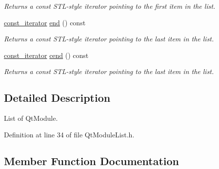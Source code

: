 \begin{DoxyCompactItemize}
\begin{DoxyCompactList}\small\item\em Returns a const S\+T\+L-\/style iterator pointing to the first item in the list. \end{DoxyCompactList}\item 
\hyperlink{class_mdt_1_1_deploy_utils_1_1_qt_module_list_ad6f5d3797918d10ffcce59cf37fcd86f}{const\+\_\+iterator} \hyperlink{class_mdt_1_1_deploy_utils_1_1_qt_module_list_ae6eb25e9f98e70ccd85a763d4ba188fd}{end} () const \hypertarget{class_mdt_1_1_deploy_utils_1_1_qt_module_list_ae6eb25e9f98e70ccd85a763d4ba188fd}{}\label{class_mdt_1_1_deploy_utils_1_1_qt_module_list_ae6eb25e9f98e70ccd85a763d4ba188fd}

\begin{DoxyCompactList}\small\item\em Returns a const S\+T\+L-\/style iterator pointing to the last item in the list. \end{DoxyCompactList}\item 
\hyperlink{class_mdt_1_1_deploy_utils_1_1_qt_module_list_ad6f5d3797918d10ffcce59cf37fcd86f}{const\+\_\+iterator} \hyperlink{class_mdt_1_1_deploy_utils_1_1_qt_module_list_ac6794cb4cc68f4218cd8b71c92f09479}{cend} () const \hypertarget{class_mdt_1_1_deploy_utils_1_1_qt_module_list_ac6794cb4cc68f4218cd8b71c92f09479}{}\label{class_mdt_1_1_deploy_utils_1_1_qt_module_list_ac6794cb4cc68f4218cd8b71c92f09479}

\begin{DoxyCompactList}\small\item\em Returns a const S\+T\+L-\/style iterator pointing to the last item in the list. \end{DoxyCompactList}\end{DoxyCompactItemize}


\subsection{Detailed Description}
List of Qt\+Module. 

Definition at line 34 of file Qt\+Module\+List.\+h.



\subsection{Member Function Documentation}
